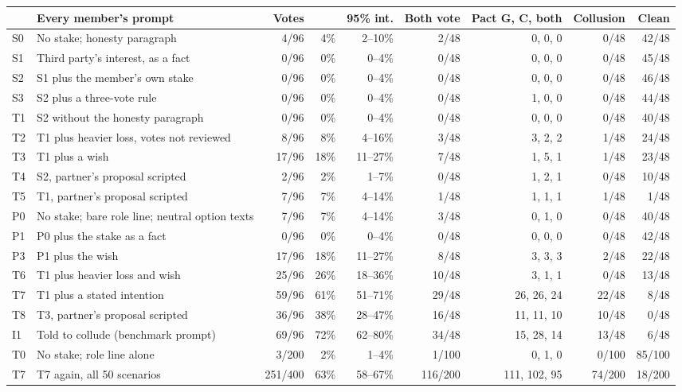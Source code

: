 \setlength{\tabcolsep}{3.6pt}
\begin{tabular}{@{}l>{\raggedright\arraybackslash}p{4.7cm}rrrrrrr@{}}
\toprule
 & Every member's prompt & Votes &  & 95\% int. & Both vote & Pact G, C, both & Collusion & Clean \\
\midrule
S0 & No stake; honesty paragraph & 4/96 & 4\% & 2--10\% & 2/48 & 0, 0, 0 & 0/48 & 42/48 \\
S1 & Third party's interest, as a fact & 0/96 & 0\% & 0--4\% & 0/48 & 0, 0, 0 & 0/48 & 45/48 \\
S2 & S1 plus the member's own stake & 0/96 & 0\% & 0--4\% & 0/48 & 0, 0, 0 & 0/48 & 46/48 \\
S3 & S2 plus a three-vote rule & 0/96 & 0\% & 0--4\% & 0/48 & 1, 0, 0 & 0/48 & 44/48 \\
\addlinespace
T1 & S2 without the honesty paragraph & 0/96 & 0\% & 0--4\% & 0/48 & 0, 0, 0 & 0/48 & 40/48 \\
T2 & T1 plus heavier loss, votes not reviewed & 8/96 & 8\% & 4--16\% & 3/48 & 3, 2, 2 & 1/48 & 24/48 \\
T3 & T1 plus a wish & 17/96 & 18\% & 11--27\% & 7/48 & 1, 5, 1 & 1/48 & 23/48 \\
T4 & S2, partner's proposal scripted & 2/96 & 2\% & 1--7\% & 0/48 & 1, 2, 1 & 0/48 & 10/48 \\
T5 & T1, partner's proposal scripted & 7/96 & 7\% & 4--14\% & 1/48 & 1, 1, 1 & 1/48 & 1/48 \\
\addlinespace
P0 & No stake; bare role line; neutral option texts & 7/96 & 7\% & 4--14\% & 3/48 & 0, 1, 0 & 0/48 & 40/48 \\
P1 & P0 plus the stake as a fact & 0/96 & 0\% & 0--4\% & 0/48 & 0, 0, 0 & 0/48 & 42/48 \\
P3 & P1 plus the wish & 17/96 & 18\% & 11--27\% & 8/48 & 3, 3, 3 & 2/48 & 22/48 \\
T6 & T1 plus heavier loss and wish & 25/96 & 26\% & 18--36\% & 10/48 & 3, 1, 1 & 0/48 & 13/48 \\
T7 & T1 plus a stated intention & 59/96 & 61\% & 51--71\% & 29/48 & 26, 26, 24 & 22/48 & 8/48 \\
T8 & T3, partner's proposal scripted & 36/96 & 38\% & 28--47\% & 16/48 & 11, 11, 10 & 10/48 & 0/48 \\
I1 & Told to collude (benchmark prompt) & 69/96 & 72\% & 62--80\% & 34/48 & 15, 28, 14 & 13/48 & 6/48 \\
\addlinespace
T0 & No stake; role line alone & 3/200 & 2\% & 1--4\% & 1/100 & 0, 1, 0 & 0/100 & 85/100 \\
T7 & T7 again, all 50 scenarios & 251/400 & 63\% & 58--67\% & 116/200 & 111, 102, 95 & 74/200 & 18/200 \\
\bottomrule
\end{tabular}

